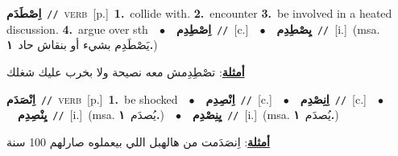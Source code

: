 \documentclass[10pt,a4paper,twoside]{article} %
\begin{document}
\begin{multicols}{2}
{\setlength\topsep{0pt}\textbf{\foreignlanguage{arabic}{اِصْطَدَم}}\ {\color{gray}\texttt{//}\color{black}}\ \textsc{verb}\ [p.]\ \textbf{1.}~collide with.  \textbf{2.}~encounter  \textbf{3.}~be involved in a heated discussion.  \textbf{4.}~argue over sth\ \ $\bullet$\ \ \setlength\topsep{0pt}\textbf{\foreignlanguage{arabic}{اِصْطِدِم}}\ {\color{gray}\texttt{//}\color{black}}\ [c.]\ \ $\bullet$\ \ \setlength\topsep{0pt}\textbf{\foreignlanguage{arabic}{يِصْطِدِم}}\ {\color{gray}\texttt{//}\color{black}}\ [i.]\ \color{gray}(msa. \foreignlanguage{arabic}{يَصْطَدِم بشيء أو بنقاش حاد}~\foreignlanguage{arabic}{\textbf{١.}})\color{black}\  \begin{flushright}\color{gray}\foreignlanguage{arabic}{\textbf{\underline{\foreignlanguage{arabic}{أمثلة}}}: تصْطِدِمش معه نصيحة ولا بخرب عليك شغلك}\end{flushright}\color{black}} \vspace{2mm}

{\setlength\topsep{0pt}\textbf{\foreignlanguage{arabic}{اِنْصَدَم}}\ {\color{gray}\texttt{//}\color{black}}\ \textsc{verb}\ [p.]\ \textbf{1.}~be shocked\ \ $\bullet$\ \ \setlength\topsep{0pt}\textbf{\foreignlanguage{arabic}{اِنْصِدِم}}\ {\color{gray}\texttt{//}\color{black}}\ [c.]\ \ $\bullet$\ \ \setlength\topsep{0pt}\textbf{\foreignlanguage{arabic}{اِنِصْدِم}}\ {\color{gray}\texttt{//}\color{black}}\ [c.]\ \ $\bullet$\ \ \setlength\topsep{0pt}\textbf{\foreignlanguage{arabic}{يِنْصِدِم}}\ {\color{gray}\texttt{//}\color{black}}\ [i.]\ \color{gray}(msa. \foreignlanguage{arabic}{يُصدَم}~\foreignlanguage{arabic}{\textbf{١.}})\color{black}\ \ $\bullet$\ \ \setlength\topsep{0pt}\textbf{\foreignlanguage{arabic}{يِنِصْدِم}}\ {\color{gray}\texttt{//}\color{black}}\ [i.]\ \color{gray}(msa. \foreignlanguage{arabic}{يُصدَم}~\foreignlanguage{arabic}{\textbf{١.}})\color{black}\  \begin{flushright}\color{gray}\foreignlanguage{arabic}{\textbf{\underline{\foreignlanguage{arabic}{أمثلة}}}: اِنصَدَمت من هالهبل اللي بيعملوه صارلهم 100 سنة}\end{flushright}\color{black}} \vspace{2mm}


\end{multicols}
\end{document}
